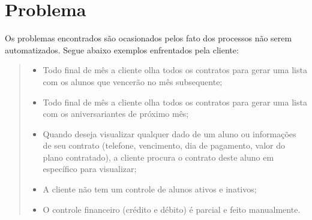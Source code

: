 \section[Problema]{Problema}
Os problemas encontrados são ocasionados pelos fato dos processos não serem automatizados. Segue abaixo exemplos enfrentados pela cliente:
\begin{quote} 
    \begin{itemize}
        \item Todo final de mês a cliente olha todos os contratos para gerar uma lista com os alunos que vencerão no mês subsequente;
		\item Todo final de mês a cliente olha todos os contratos para gerar uma lista com os aniversariantes de próximo mês;
		\item Quando deseja visualizar qualquer dado de um aluno ou informações de seu contrato (telefone, vencimento, dia de pagamento, valor do plano contratado), a cliente procura o contrato deste aluno em específico para visualizar;
		\item A cliente não tem um controle de alunos ativos e inativos;
		\item O controle financeiro (crédito e débito) é parcial e feito manualmente.
    \end{itemize}
\end{quote}